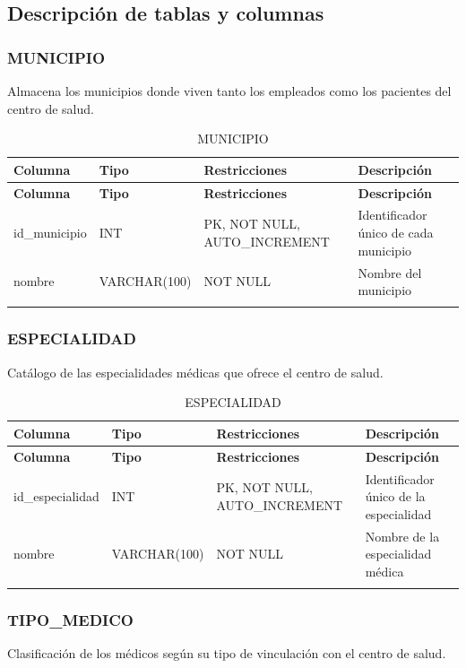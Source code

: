 \documentclass[12pt,a4paper]{article}
\begin{document}
\subsection{Descripci\'on de tablas y columnas}

\subsubsection{MUNICIPIO}
Almacena los municipios donde viven tanto los empleados como los pacientes del centro de salud.

{\small\begin{longtable}{|p{2.3cm}|p{3.3cm}|p{4.2cm}|p{4.2cm}|}
\hline
\textbf{Columna} & \textbf{Tipo} & \textbf{Restricciones} & \textbf{Descripci\'on} \\ \hline
\endfirsthead
\hline
\textbf{Columna} & \textbf{Tipo} & \textbf{Restricciones} & \textbf{Descripci\'on} \\ \hline
\endhead
id\_municipio & INT & PK, NOT NULL, AUTO\_INCREMENT & Identificador \'unico de cada municipio \\ \hline
nombre & VARCHAR(100) & NOT NULL & Nombre del municipio \\ \hline
\caption{MUNICIPIO}
\end{longtable}}

\subsubsection{ESPECIALIDAD}
Cat\'alogo de las especialidades m\'edicas que ofrece el centro de salud.

{\small\begin{longtable}{|p{2.3cm}|p{3.3cm}|p{4.2cm}|p{4.2cm}|}
\hline
\textbf{Columna} & \textbf{Tipo} & \textbf{Restricciones} & \textbf{Descripci\'on} \\ \hline
\endfirsthead
\hline
\textbf{Columna} & \textbf{Tipo} & \textbf{Restricciones} & \textbf{Descripci\'on} \\ \hline
\endhead
id\_especialidad & INT & PK, NOT NULL, AUTO\_INCREMENT & Identificador \'unico de la especialidad \\ \hline
nombre & VARCHAR(100) & NOT NULL & Nombre de la especialidad m\'edica \\ \hline
\caption{ESPECIALIDAD}
\end{longtable}}

\subsubsection{TIPO\_MEDICO}
Clasificaci\'on de los m\'edicos seg\'un su tipo de vinculaci\'on con el centro de salud.
\end{document}
